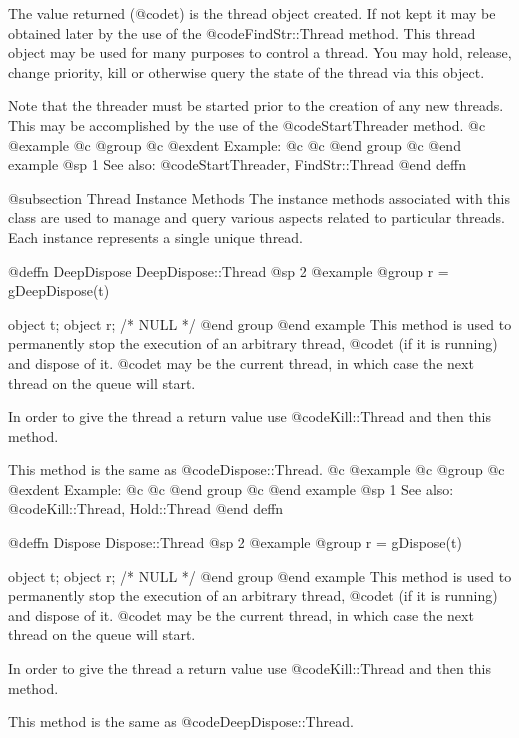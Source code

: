The value returned (@code{t}) is the thread object created.  If not
kept it may be obtained later by the use of the @code{FindStr::Thread}
method.  This thread object may be used for many purposes to control
a thread.  You may hold, release, change priority, kill or otherwise
query the state of the thread via this object.

Note that the threader must be started prior to the creation of any new
threads.  This may be accomplished by the use of the @code{StartThreader}
method.  
@c @example
@c @group
@c @exdent Example:
@c 
@c @end group
@c @end example
@sp 1
See also:  @code{StartThreader, FindStr::Thread}
@end deffn



@subsection Thread Instance Methods
The instance methods associated with this class are used to manage and
query various aspects related to particular threads.  Each instance
represents a single unique thread.





@deffn {DeepDispose} DeepDispose::Thread
@sp 2
@example
@group
r = gDeepDispose(t)

object  t;
object  r;     /*  NULL  */
@end group
@end example
This method is used to permanently stop the execution of an arbitrary
thread, @code{t} (if it is running) and dispose of it.  @code{t} may be
the current thread, in which case the next thread on the queue will
start.

In order to give the thread a return value use @code{Kill::Thread}
and then this method.

This method is the same as @code{Dispose::Thread}.
@c @example
@c @group
@c @exdent Example:
@c 
@c @end group
@c @end example
@sp 1
See also:  @code{Kill::Thread, Hold::Thread}
@end deffn







@deffn {Dispose} Dispose::Thread
@sp 2
@example
@group
r = gDispose(t)

object  t;
object  r;     /*  NULL  */
@end group
@end example
This method is used to permanently stop the execution of an arbitrary
thread, @code{t} (if it is running) and dispose of it.  @code{t} may be
the current thread, in which case the next thread on the queue will
start.

In order to give the thread a return value use @code{Kill::Thread}
and then this method.

This method is the same as @code{DeepDispose::Thread}.

